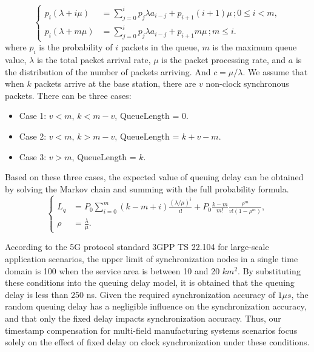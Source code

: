 \documentclass[english]{cccconf}
\begin{document}
\begin{equation}
	\left\{
	\begin{aligned}
		p_i\left( \lambda +i \mu \right) &=\sum_{j=0}^i{p_j \lambda  a_{i-j}+p_{i+1}\left( i+1 \right)  \mu\, ; 0\leqslant i<m},\\
		p_i\left( \lambda +m \mu \right) &=\sum_{j=0}^i{p_j \lambda  a_{i-j}+p_{i+1}m \mu}\,; m\leqslant i.
	\end{aligned}
	\right.
\end{equation}
where $p_i$ is the probability of $i$ packets in the queue, $m$ is the maximum queue value, $\lambda$ is the total packet arrival rate, $\mu$ is the packet processing rate, and $a$ is the distribution of the number of packets arriving. And $c=\mu/\lambda $. We assume that when $k$ packets arrive at the base station, there are $v$ non-clock synchronous packets. There can be three cases:
\begin{itemize}
	\item Case 1: $v<m$, $k<m-v$, QueueLength = 0.
	\item Case 2: $v<m$, $k>m-v$, QueueLength = $k+v-m$.
	\item Case 3: $v>m$, QueueLength = $k$.
\end{itemize}

Based on these three cases, the expected value of queuing delay can be obtained by solving the Markov chain and summing with the full probability formula.
\begin{equation}
	\left\{
	\begin{aligned}
		L_q&=P_0 \sum_{i=0}^m{\left(k-m+i\right) \frac{\left(\lambda/\mu\right)^i}{i!}+P_0 \frac{k-m}{m!}\frac{\rho^m}{v!\left(1-\rho^m\right)}},\\
		\rho&=\frac{\lambda}{\mu}.
	\end{aligned}
	\right.
\end{equation}

According to the 5G protocol standard 3GPP TS 22.104 for large-scale application scenarios, the upper limit of synchronization nodes in a single time domain is 100 when the service area is between 10 and 20 $km^2$\cite{888889}. By substituting these conditions into the queuing delay model, it is obtained that the queuing delay is less than 250 ns. Given the required synchronization accuracy of $1\mu s$, the random queuing delay has a negligible influence on the synchronization accuracy, and that only the fixed delay impacts synchronization accuracy. Thus, our timestamp compensation for multi-field manufacturing systems scenarios focus solely on the effect of fixed delay on clock synchronization under these conditions.
\end{document}
